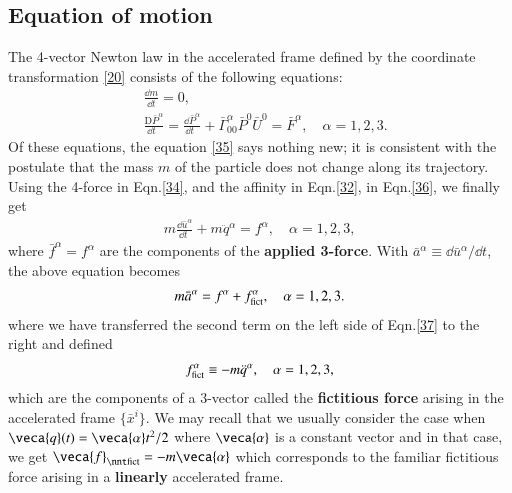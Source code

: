 \documentclass[10pt]{article}
\begin{document}
\subsection{Equation of motion}
The 4-vector Newton law in the 
accelerated frame  defined by the coordinate transformation 
\eqref{20}  consists of the following equations: 
\begin{align}\label{35}
&\frac{\dd m}{\dd t}=0,\\\label{36}
&\frac{\mathrm{D} {\bar{P}}^\alpha}{\dd t\;\:}= 
\frac{\dd \bar{P}^\alpha}{\dd t\;\:} + 
\bar{\Gamma}^\alpha_{00} \bar{P}^0 \bar{U}^0= 
{\bar{F}^\alpha},\quad 
\alpha=1,2,3. 
\end{align} 
Of these equations, the equation \eqref{35} says nothing 
new; it  is consistent with the postulate  that the mass 
$m$ 
of the  particle does not change along its trajectory. 
Using 
the 4-force in Eqn.\eqref{34}, and the affinity in 
Eqn.\eqref{32}, in Eqn.\eqref{36}, we finally get
\begin{align}\label{37}
m\frac{\dd \bar{u}^\alpha}{\dd t\;}+m{\ddot{q}}{}^\alpha= 
f^\alpha, \quad 
\alpha=1,2,3,
\end{align}
where $\bar{f}^{\alpha}={f}^{\alpha}$ are the components of 
the \textbf{applied 3-force}. 
With $\bar{a}^\alpha\equiv{\dd \bar{u}^\alpha/\dd t}$,  the 
above equation becomes
\begin{align}\label{38}
m\bar{a}^\alpha= f^\alpha+ 
f_{\rm{fict}}^\alpha,\quad \alpha=1,2,3.
\end{align}
where we have transferred the second term on the left side 
of Eqn.\eqref{37} to the right and defined
\begin{align}\label{39}
f_{\rm{fict}}^\alpha \equiv -m\ddot{q}^\alpha,\quad 
\alpha=1,2,3,
\end{align}
which are the components of a 3-vector called the 
\textbf{fictitious force} arising in the  accelerated frame 
$\{\bar{x}^i \}$. We may recall that we usually consider the 
case  when $\veca{q}(t)=\veca{\alpha} t^2/2$ where 
$\veca{\alpha}$ is a constant vector and in that  case, we 
get $\veca{f}_{\nnt\rm{fict}}=-m\veca{\alpha}$ which 
corresponds to  the familiar fictitious force arising in a 
\textbf{linearly} accelerated frame.
\end{document}
